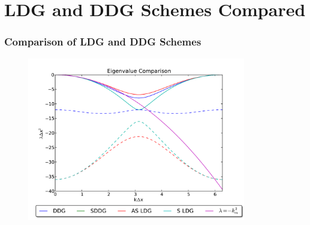 \documentclass[serif,12pt]{beamer}
\begin{document}
\section{LDG and DDG Schemes Compared}
\begin{frame}
\frametitle{Comparison of LDG and DDG Schemes}
	\begin{figure}
   		\includegraphics[width=0.85\textwidth]{compareDiffusionSchemes.pdf}
	\end{figure}
\end{frame}
\end{document}
